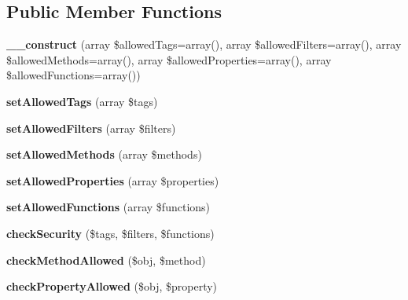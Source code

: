 \subsection*{Public Member Functions}
\begin{DoxyCompactItemize}
\item 
\hypertarget{class_twig___sandbox___security_policy_a288ff1d009a46e1e8660669fc19afd17}{}{\bfseries \+\_\+\+\_\+construct} (array \$allowed\+Tags=array(), array \$allowed\+Filters=array(), array \$allowed\+Methods=array(), array \$allowed\+Properties=array(), array \$allowed\+Functions=array())\label{class_twig___sandbox___security_policy_a288ff1d009a46e1e8660669fc19afd17}

\item 
\hypertarget{class_twig___sandbox___security_policy_a4125bc9f2be37e437d0ba7c7247e3f13}{}{\bfseries set\+Allowed\+Tags} (array \$tags)\label{class_twig___sandbox___security_policy_a4125bc9f2be37e437d0ba7c7247e3f13}

\item 
\hypertarget{class_twig___sandbox___security_policy_ae0bdb77fd92459be98bdfefa9f718440}{}{\bfseries set\+Allowed\+Filters} (array \$filters)\label{class_twig___sandbox___security_policy_ae0bdb77fd92459be98bdfefa9f718440}

\item 
\hypertarget{class_twig___sandbox___security_policy_af566c2892a8cee90ee805464f8af9555}{}{\bfseries set\+Allowed\+Methods} (array \$methods)\label{class_twig___sandbox___security_policy_af566c2892a8cee90ee805464f8af9555}

\item 
\hypertarget{class_twig___sandbox___security_policy_adebca74d932998a242294bd7ca96b785}{}{\bfseries set\+Allowed\+Properties} (array \$properties)\label{class_twig___sandbox___security_policy_adebca74d932998a242294bd7ca96b785}

\item 
\hypertarget{class_twig___sandbox___security_policy_a60d0caccd400dac1a01c50edb61d5927}{}{\bfseries set\+Allowed\+Functions} (array \$functions)\label{class_twig___sandbox___security_policy_a60d0caccd400dac1a01c50edb61d5927}

\item 
\hypertarget{class_twig___sandbox___security_policy_a0cc084f6abef1e1ba223ddd057ddcd2b}{}{\bfseries check\+Security} (\$tags, \$filters, \$functions)\label{class_twig___sandbox___security_policy_a0cc084f6abef1e1ba223ddd057ddcd2b}

\item 
\hypertarget{class_twig___sandbox___security_policy_a90633d7d23e0b157387b886a8ef87a36}{}{\bfseries check\+Method\+Allowed} (\$obj, \$method)\label{class_twig___sandbox___security_policy_a90633d7d23e0b157387b886a8ef87a36}

\item 
\hypertarget{class_twig___sandbox___security_policy_a182de0b428b216f43d865cbf54ff7c4c}{}{\bfseries check\+Property\+Allowed} (\$obj, \$property)\label{class_twig___sandbox___security_policy_a182de0b428b216f43d865cbf54ff7c4c}

\end{DoxyCompactItemize}
